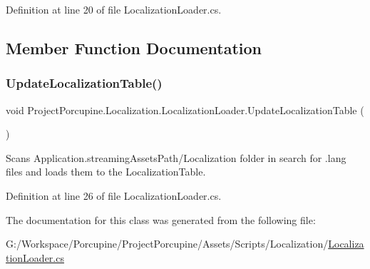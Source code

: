 Definition at line 20 of file Localization\+Loader.\+cs.



\subsection{Member Function Documentation}
\mbox{\label{class_project_porcupine_1_1_localization_1_1_localization_loader_a81c620fb63ad11ef3c75024d3245a769}} 
\subsubsection{\texorpdfstring{Update\+Localization\+Table()}{UpdateLocalizationTable()}}
{\footnotesize\ttfamily void Project\+Porcupine.\+Localization.\+Localization\+Loader.\+Update\+Localization\+Table (\begin{DoxyParamCaption}{ }\end{DoxyParamCaption})}



Scans Application.\+streaming\+Assets\+Path/\+Localization folder in search for .lang files and load\textquotesingle{}s them to the Localization\+Table. 



Definition at line 26 of file Localization\+Loader.\+cs.



The documentation for this class was generated from the following file\+:\begin{DoxyCompactItemize}
\item 
G\+:/\+Workspace/\+Porcupine/\+Project\+Porcupine/\+Assets/\+Scripts/\+Localization/\hyperlink{_localization_loader_8cs}{Localization\+Loader.\+cs}\end{DoxyCompactItemize}
